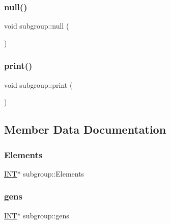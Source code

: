 \mbox{\label{classsubgroup_a2ed11b774ef317eecda224471524f313}} 
\subsubsection{\texorpdfstring{null()}{null()}}
{\footnotesize\ttfamily void subgroup\+::null (\begin{DoxyParamCaption}{ }\end{DoxyParamCaption})}

\mbox{\label{classsubgroup_a45eec97b9961a7ebe6046eb458c45974}} 
\subsubsection{\texorpdfstring{print()}{print()}}
{\footnotesize\ttfamily void subgroup\+::print (\begin{DoxyParamCaption}{ }\end{DoxyParamCaption})}



\subsection{Member Data Documentation}
\mbox{\label{classsubgroup_a82c231e10723e796ad47411c8948cdbb}} 
\subsubsection{\texorpdfstring{Elements}{Elements}}
{\footnotesize\ttfamily \mbox{\hyperlink{galois_8h_a09fddde158a3a20bd2dcadb609de11dc}{I\+NT}}$\ast$ subgroup\+::\+Elements}

\mbox{\label{classsubgroup_a8210a28fdd7e9f648f8b7ea37b84ade5}} 
\subsubsection{\texorpdfstring{gens}{gens}}
{\footnotesize\ttfamily \mbox{\hyperlink{galois_8h_a09fddde158a3a20bd2dcadb609de11dc}{I\+NT}}$\ast$ subgroup\+::gens}


